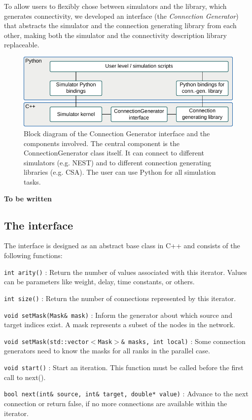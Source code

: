 \documentclass{frontiersSCNS} %
\newcommand{\tbw}[1]{{\bf\parindent0pt\color{red}#1}}
\begin{document}
To allow users to flexibly chose between simulators and the library,
which generates connectivity, we developed an interface (the
\emph{Connection Generator}) that abstracts the simulator and the
connection generating library from each other, making both the
simulator and the connectivity description library replaceable.

\begin{figure}[ht]
\centering
\includegraphics[scale=.8]{figures/block_diagram_conngen.pdf}
\caption{Block diagram of the Connection Generator interface and the
  components involved. The central component is the
  ConnectionGenerator class itself. It can connect to different simulators
  (e.g. NEST) and to different connection generating libraries
  (e.g. CSA). The user can use Python for all simulation
  tasks.}\label{fig:block_diagram_conngen}
\end{figure}

\tbw{To be written}

\subsection{The interface}

The interface is designed as an abstract base class in C++ and
consists of the following functions:

\begin{unlist}
\item[\tt int arity()]: Return the number of values associated with this
  iterator. Values can be parameters like weight, delay, time
  constants, or others.
\item[\tt int size()]: Return the number of connections represented by
  this iterator.
\item[\tt void setMask(Mask\& mask)]: Inform the generator about which
  source and target indices exist. A mask represents a subset of the
  nodes in the network.
\item[\tt void setMask(std::vector$<$Mask$>$\& masks, int local)]: Some
  connection generators need to know the masks for all ranks in the
  parallel case.
\item[\tt void start()]: Start an iteration. This function must be called
  before the first call to next().
\item[\tt bool next(int\& source, int\& target, double* value)]: Advance
  to the next connection or return false, if no more connections are
  available within the iterator.
\end{unlist}
\end{document}
